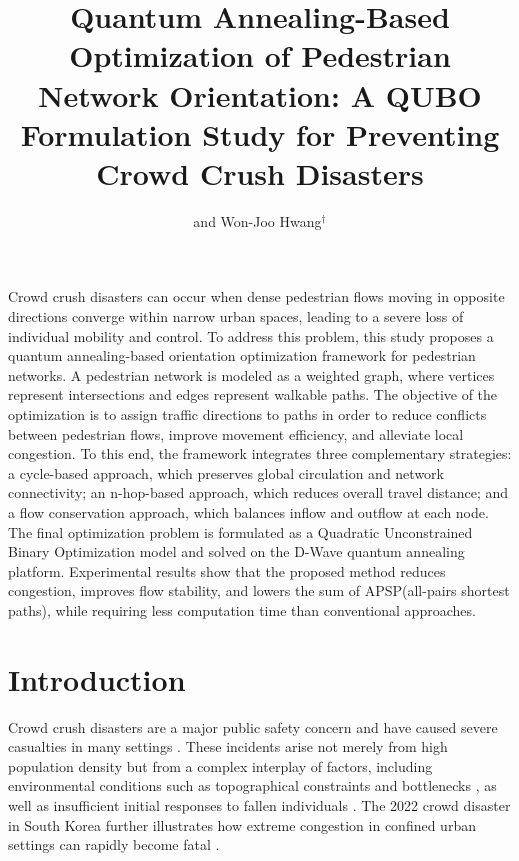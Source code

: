 \documentclass[twocolumn,a4paper]{article} %
\begin{document}
\title{Quantum Annealing-Based Optimization of
Pedestrian Network Orientation:
A QUBO Formulation Study for Preventing Crowd
Crush Disasters}
\author{and Won-Joo Hwang${}^\dag$}
\address{\dag Department of Information Convergence Engineering, Pusan National University \\
Busan 46241, Republic of Korea \\
Email: , , }
\maketitle

\abstract
Crowd crush disasters can occur when dense pedestrian flows moving in opposite directions converge within narrow urban spaces, leading to a severe loss of individual mobility and control. To address this
problem, this study proposes a quantum annealing-based orientation
optimization framework for pedestrian networks. A pedestrian network
is modeled as a weighted graph, where vertices represent intersections
and edges represent walkable paths. The objective of the optimization is to assign traffic directions to paths in order to reduce conflicts
between pedestrian flows, improve movement efficiency, and alleviate
local congestion. To this end, the framework integrates three complementary strategies: a cycle-based approach, which preserves global circulation and network connectivity; an n-hop-based approach, which reduces overall travel distance; and a flow conservation approach, which
balances inflow and outflow at each node. The final optimization problem is formulated as a Quadratic Unconstrained Binary Optimization
model and solved on the D-Wave quantum annealing platform. Experimental results show that the proposed method reduces congestion,
improves flow stability, and lowers the sum of APSP(all-pairs shortest paths), while requiring less computation time than conventional
approaches.

\endabstract
\section{Introduction} \label{sec:intro}

Crowd crush disasters are a major public safety concern and have caused severe casualties in many settings \cite{fruin1993causes}. These incidents arise not merely from high population density but from a complex interplay of factors, including environmental conditions such as topographical constraints and bottlenecks \cite{helbing2007dynamics}, as well as insufficient initial responses to fallen individuals \cite{soomaroo2012disasters}. The 2022 crowd disaster in South Korea further illustrates how extreme congestion in confined urban settings can rapidly become fatal \cite{chang2024crowd}.
\end{document}
